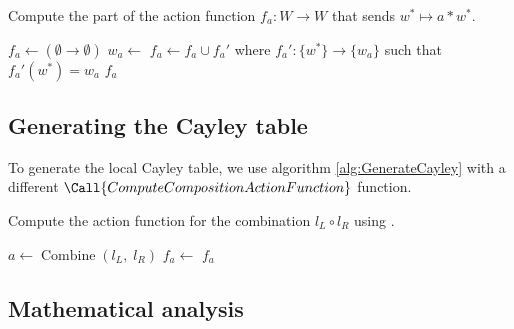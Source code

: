 \begin{algorithm}[H]
	\caption{
		Compute the part of the action function $f_{a}: W \to W$ that sends $w^{*} \mapsto a \ast w^{*}$.
	}
    \label{alg:LocalComputeActionFunction}
	\hrulefill
	\begin{algorithmic}[1]
		\State $f_{a} \gets (\emptyset \to \emptyset)$
		\State $w_{a} \gets$ 
		\State $f_{a} \gets f_{a} \cup f_{a}'$ where $f_{a}': \{w^{*}\} \to \{w_{a}\}$ such that $f_{a}'(w^{*}) = w_{a}$
		\State \Return $f_{a}$
		\EndProcedure
	\end{algorithmic}
\end{algorithm}

\subsection{Generating the Cayley table}

To generate the local Cayley table, we use algorithm \ref{alg:GenerateCayley} with a different $\Call{ComputeCompositionActionFunction}$ function.

\begin{algorithm}[H]
	\caption{
		Compute the action function for the combination $l_{L} \circ l_{R}$ using .
	}
        \label{alg:ComputeCompositionActionFunction_local}
	\hrulefill
	\begin{algorithmic}[1]
		      \State $a \gets \operatorname{Combine}(l_{L}, \; l_{R})$
                \State $f_{a} \gets$ 
                \State \Return $f_{a}$
		\EndProcedure
	\end{algorithmic}
\end{algorithm}


\subsection{Mathematical analysis}

